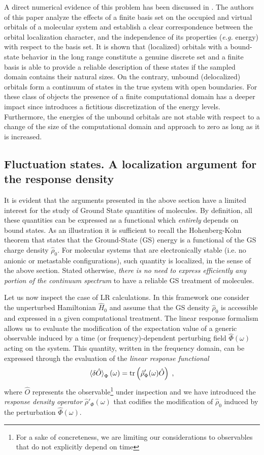 \documentclass[reprint,aps,prb]{revtex4-1}
\newcommand{\be}{\begin{equation}}
\newcommand{\ee}{\end{equation}}
\newcommand{\lb}{\label}
\newcommand{\op}[1]{\hat {#1}}
\newcommand{\trace}[1]{\mathrm{tr}\left(#1\right)}
\newcommand{\dmnot}{\op{\rho}_0}
\newcommand{\dm}{\op{\rho}}
\newcommand{\hnot}{\op{H}_0}
\begin{document}
A direct numerical evidence of this problem has been discussed in \cite{boffi2016}. The authors of this paper analyze the effects of a finite basis set on the 
occupied and virtual orbitals of a molecular system and establish a clear correspondence between the orbital localization character, and the independence of its properties (\emph{e.g.} energy) 
with respect to the basis set. It is shown that (localized) orbitals with a bound-state behavior in the long range constitute a genuine discrete set and a finite basis is 
able to provide a reliable description of these states if the sampled domain contains their natural sizes. On the contrary, unbound (delocalized) orbitals form a continuum of states in the 
true system with open boundaries. For these class of objects the presence of a finite computational domain has a deeper impact since introduces a fictitious discretization of the energy levels. 
Furthermore, the energies of the unbound orbitals are not stable with respect to a change of the size of the computational domain and approach to zero as long as it is increased.  


\subsection{Fluctuation states. A localization argument for the response density}
It is evident that the arguments presented in the above section have a limited interest for the study
of Ground State quantities of molecules. By definition, all these quantities can be expressed as a 
functional which \emph{entirely} depends on bound states. As an illustration it is sufficient to recall
the Hohenberg-Kohn theorem that states that the Ground-State (GS) energy is a functional of the GS
charge density $\dmnot$. For molecular systems that are electronically stable (i.e. no anionic or metastable configurations),
such quantity is localized, in the sense of the above section. Stated otherwise, 
\emph{there is no need to express efficiently any portion of the continuum spectrum} to have a reliable GS treatment of molecules.

Let us now inspect the case of LR calculations.
In this framework one consider the unperturbed Hamiltonian $\hnot$ and assume that 
the GS density $\dmnot$ is accessible and expressed in a given computational treatment. 
The linear response formalism allows us to evaluate the modification of the expectation value of a generic observable induced by a 
time (or frequency)-dependent perturbing field $\op\Phi(\omega)$ acting on the system. 
This quantity, written in the frequency domain, can be expressed through the evaluation of the \emph{linear response functional}
\be\lb{LinearResponseFunctDef1}
\braket{\delta\op O}_\Phi(\omega) = \trace{\dm'_\Phi(\omega)\op O} \;,
\ee
where $\op O$ represents the observable\footnote{For a sake of concreteness, we are limiting our considerations to observables that do not explicitly depend on time} under inspection 
and we have introduced the \emph{response density operator} $\dm'_\Phi(\omega)$ that codifies the modification of $\dmnot$ induced by the perturbation $\op\Phi(\omega)$. 
\end{document}
